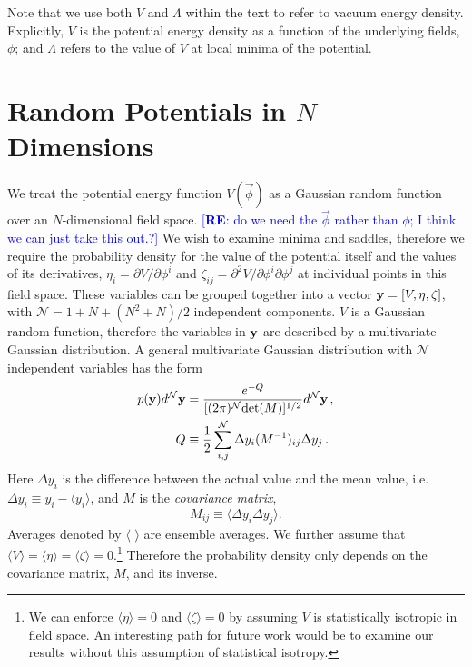 \documentclass[12pt]{article}
\newcommand{\re}[1]{\textcolor{blue}{[{\bf RE}: #1]}}
\begin{document}
Note that we use both $V$ and $\Lambda$ within the text to refer to vacuum energy density. Explicitly, $V$ is the potential energy density as a function of the underlying fields, $\phi$; and $\Lambda$ refers to the value of $V$ at local minima of the potential.
 
 
\section{Random Potentials in $N$ Dimensions}

We treat the potential energy function $V({\vec{\phi}})$ as a Gaussian random function over an $N$-dimensional field space. \re{do we need the $\vec{\phi}$ rather than $\phi$; I think we can just take this out.?} We wish to examine minima and saddles, therefore we require the probability density for the value of the potential itself and the values of its derivatives, $\eta_i = \partial V/\partial \phi^i$ and $\zeta_{ij}=\partial^2 V/\partial \phi^i\partial \phi^j$ at individual points in this field space. These variables can be grouped together into a vector ${\bf y} = [V,\eta,\zeta]$, with $\mathcal{N}=1+N+(N^2+N)/2$ independent components. $V$ is a Gaussian random function, therefore the variables in ${\bf y}$ are described by a multivariate Gaussian distribution. A general multivariate Gaussian distribution with $\mathcal{N}$ independent variables has the form
\begin{equation} \label{MultivariateGaussian}
\begin{split}
p({\bf y})d^\mathcal{N}{\bf y} &= \frac{e^{-Q}}{[(2\pi)^\mathcal{N} \mathrm{det}(M)]^{1/2}} d^\mathcal{N}{\bf y} \, ,\\
Q &\equiv \frac{1}{2} \sum_{i,j}^\mathcal{N} \Delta y_i (M^{-1})_{ij} \Delta y_{j} \, .\\
\end{split}
\end{equation}
%
Here $\Delta y_i$ is the difference between the actual value and the mean value, i.e. $\Delta y_i \equiv y_i - \langle y_i \rangle$, and $M$ is the \emph{covariance matrix}, 
%
\begin{equation}
M_{ij} \equiv \langle \Delta y_i \Delta y_j \rangle.
\end{equation}
%
Averages denoted by $\langle \,\,\rangle$ are ensemble averages. We further assume that $\langle V\rangle = \langle \eta\rangle = \langle \zeta\rangle = 0$.\footnote{We can enforce $\langle \eta \rangle = 0$ and $\langle \zeta\rangle = 0$ by assuming $V$ is statistically isotropic in field space. An interesting path for future work would be to examine our results without this assumption of statistical isotropy.} Therefore the probability density only depends on the covariance matrix, $M$, and its inverse.
\end{document}
